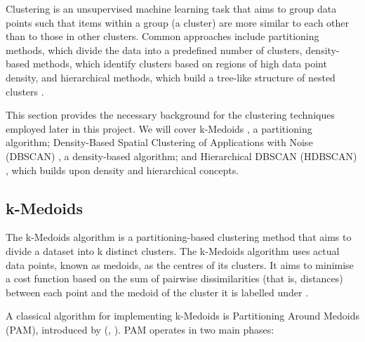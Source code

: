 \documentclass[10pt,oneside]{report}
\renewcommand{\citet}[1]{\citeauthor{#1}, \citeyear{#1}}
\begin{document}
Clustering is an unsupervised machine learning task that aims to group data points such that items within a group (a cluster) are more similar to each other than to those in other clusters. Common approaches include partitioning methods, which divide the data into a predefined number of clusters, density-based methods, which identify clusters based on regions of high data point density, and hierarchical methods, which build a tree-like structure of nested clusters \cite{kaufman2009finding}.

This section provides the necessary background for the clustering techniques employed later in this project. We will cover k-Medoids \cite{kmedoids}, a partitioning algorithm; Density-Based Spatial Clustering of Applications with Noise (DBSCAN) \cite{ester1996density}, a density-based algorithm; and Hierarchical DBSCAN (HDBSCAN) \cite{campello2013density}, which builds upon density and hierarchical concepts.


\subsection{k-Medoids}
The k-Medoids algorithm is a partitioning-based clustering method that aims to divide a dataset into k distinct clusters. The k-Medoids algorithm uses actual data points, known as medoids, as the centres of its clusters. It aims to minimise a cost function based on the sum of pairwise dissimilarities (that is, distances) between each point and the medoid of the cluster it is labelled under \cite{kmedoids}.

A classical algorithm for implementing k-Medoids is Partitioning Around Medoids (PAM), introduced by (\citet{kmedoids}). PAM operates in two main phases:
\end{document}
